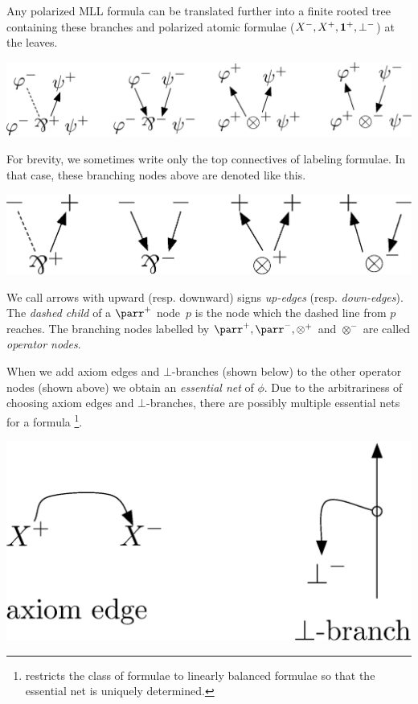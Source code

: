 Any polarized MLL formula can be translated further into
a finite rooted tree containing these branches and polarized atomic formulae
($X^-, X^+, \mathbf{1}^+,\bot^-$) at the leaves.
 \begin{center}
  \includegraphics[scale=0.4]{rules-original.eps}
 \end{center}
For brevity, we sometimes write only the top connectives of labeling
formulae.
In that case, these branching nodes above are denoted like this.
 \begin{center} %
  \includegraphics[scale=0.4]{rules.eps}
 \end{center}
We call arrows with upward (resp. downward) signs
\textit{up-edges}
(resp. \textit{down-edges}).
The \textit{dashed child}
of a $\parr^+$ node~$p$ is the node which the dashed
line from $p$ reaches.
The branching nodes labelled by $\parr^+, \parr^-, \otimes^+$ and
$\otimes^-$ are called \textit{operator nodes}.

When we add axiom edges and $\bot$-branches (shown below)
to the other operator nodes (shown above)
we obtain an \textit{essential net} of $\phi$.
Due to the arbitrariness of choosing axiom edges and $\bot$-branches,
there are possibly multiple essential nets for a formula%
\footnote{\citet{murawski2003} restricts the class of formulae to linearly balanced
formulae so that the essential net is uniquely determined.}.
 \begin{center}
  \includegraphics[scale=0.4]{axiom-cut.eps}
 \end{center}

